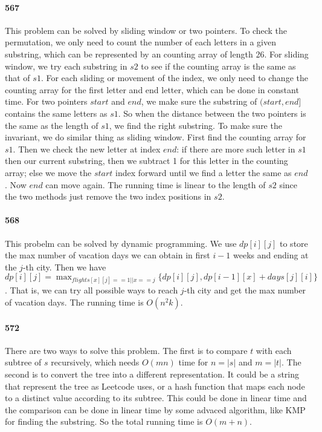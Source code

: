 \documentclass[11pt]{article}
\begin{document}
\begin{itemize}
\paragraph{567}
This problem can be solved by sliding window or two pointers.
To check the permutation, we only need to count the number of each letters in a given substring, which can be represented by an 
counting array of length 26.
For sliding window, we try each substring in $s2$ to see if the counting array is the same as that of $s1$.
For each sliding or movement of the index, we only need to change the counting array for the first letter and end letter, which
can be done in constant time.
For two pointers $start$ and $end$, we make sure the substring of $(start, end]$ contains the same letters as $s1$. So when the 
distance between the two pointers is the same as the length of $s1$, we find the right substring. To make sure the invariant, 
we do similar thing as sliding window. First find the counting array for $s1$. Then we check the new letter at index $end$: if
there are more such letter in $s1$ then our current substring, then we subtract 1 for this letter in the counting array; else
we move the $start$ index forward until we find a letter the same as $end$.
Now $end$ can move again.
The running time is linear to the length of $s2$ since the two methods just remove the two index positions in $s2$.

\paragraph{568}
This probelm can be solved by dynamic programming.
We use $dp[i][j]$ to store the max number of vacation days we can obtain in first $i-1$ weeks and ending at the $j$-th city.
Then we have $dp[i][j] = \max_{flights[x][j] == 1 || x == j} \{ dp[i][j], dp[i-1][x] + days[j][i] \}$. 
That is, we can try all possible ways to reach $j$-th city and get the max number of vacation days.
The running time is $O(n^2 k)$.

\paragraph{572}
There are two ways to solve this problem. The first is to compare $t$ with each subtree of $s$ recursively, which needs $O(mn)$ time for $n = |s|$ and $m = |t|$. The second is to convert the tree into a different representation. It could be a
string that represent the tree as Leetcode uses, or a hash function that maps each node to a distinct value according to its
subtree. This could be done in linear time and the comparison can be done in linear time by some advaced algorithm, like KMP 
for finding the substring. So the total running time is $O(m + n)$.


\end{itemize}
\end{document}
